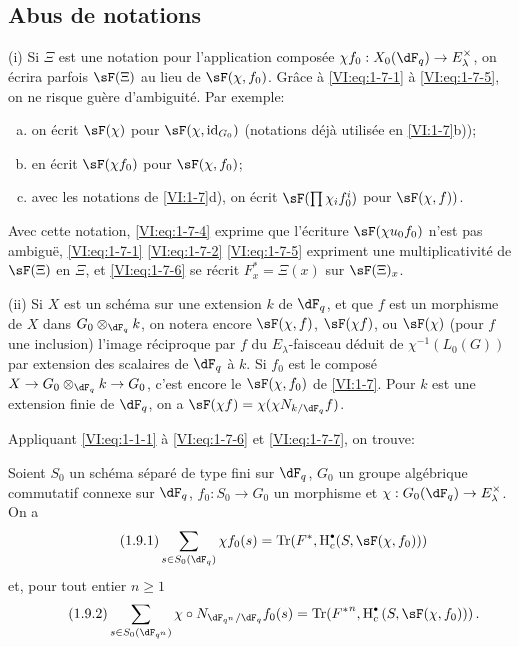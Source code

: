 \subsection{Abus de notations}\label{VI:1-8}

(i) Si $\Xi$ est une notation pour l'application composée 
$\chi f_0:X_0(\dF_q) \to E_\lambda^\times$, on écrira parfois $\sF(\Xi)$ au 
lieu de $\sF(\chi,f_0)$. Grâce à \eqref{VI:eq:1-7-1} à \eqref{VI:eq:1-7-5}, 
on ne risque guère d'ambiguité. Par exemple:
\begin{enumerate}[a)]
  \item on écrit $\sF(\chi)$ pour $\sF(\chi,\operatorname{id}_{G_0})$ 
    (notations déjà utilisée en \ref{VI:1-7}b)); 
  \item en écrit $\sF(\chi f_0)$ pour $\sF(\chi,f_0)$;
  \item avec les notations de \ref{VI:1-7}d), on écrit 
    $\sF(\prod \chi_i f_0^i)$ pour $\sF(\chi,f))$. 
\end{enumerate}

Avec cette notation, \eqref{VI:eq:1-7-4} exprime que l'écriture 
$\sF(\chi u_0 f_0)$ n'est pas ambiguë, \eqref{VI:eq:1-7-1} \eqref{VI:eq:1-7-2} 
\eqref{VI:eq:1-7-5} expriment une multiplicativité de $\sF(\Xi)$ en $\Xi$, 
et \eqref{VI:eq:1-7-6} se récrit $F_x^\ast = \Xi(x)$ sur $\sF(\Xi)_x$.

(ii) Si $X$ est un schéma sur une extension $k$ de $\dF_q$, et que $f$ est un 
morphisme de $X$ dans $G_0\otimes_{\dF_q} k$, on notera encore $\sF(\chi,f)$, 
$\sF(\chi f)$, ou $\sF(\chi)$ (pour $f$ une inclusion) l'image réciproque par 
$f$ du $E_\lambda$-faisceau déduit de $\chi^{-1}(L_0(G))$ par extension des 
scalaires de $\dF_q$ à $k$. Si $f_0$ est le composé 
$X\to G_0\otimes_{\dF_q} k \to G_0$, c'est encore le $\sF(\chi,f_0)$ de 
\ref{VI:1-7}. Pour $k$ est une extension finie de $\dF_q$, on a 
$\sF(\chi f) = \chi(\chi N_{k/\dF_q} f)$. 

Appliquant \eqref{VI:eq:1-1-1} à \eqref{VI:eq:1-7-6} et \eqref{VI:eq:1-7-7}, 
on trouve: 





\begin{theorem_}\label{VI:1-9}
Soient $S_0$ un schéma séparé de type fini sur $\dF_q$, $G_0$ un groupe 
algébrique commutatif connexe sur $\dF_q$, $f_0:S_0\to G_0$ un morphisme et 
$\chi:G_0(\dF_q) \to E_\lambda^\times$. On a 
\begin{equation*}\tag{1.9.1}\label{VI:eq:1-9-1}
  \sum_{s\in S_0(\dF_q)} \chi f_0(s) = \tr(F^\ast,\h_c^\bullet(S,\sF(\chi,f_0))) 
\end{equation*}
et, pour tout entier $n\geqslant 1$
\begin{equation*}\tag{1.9.2}\label{VI:eq:1-9-2}
  \sum_{s\in S_0(\dF_{q^n})} \chi\circ N_{\dF_{q^n}/\dF_q} f_0(s) = \tr({F^\ast}^n, \h_c^\bullet\left(S,\sF(\chi,f_0))\right) \text{.}
\end{equation*}
\end{theorem_}





